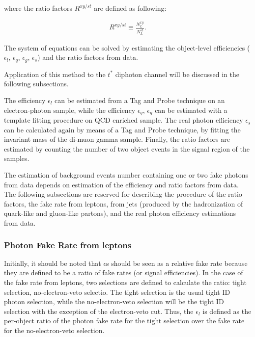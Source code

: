\documentclass[12pt,oneandhalf,chaparabic,phys,ms,eng]{metu}
\begin{document}
where the ratio factors $R^{xy/st}$ are defined as following:


\begin{eqnarray}
R^{xy/st} \equiv \frac{N_{L}^{xy}}{N_{L}^{st}}. \label{eq:R1}
\end{eqnarray}

The system of equations can be solved by estimating the object-level efficiencies ($\epsilon_l$, $\epsilon_q$, $\epsilon_g$, $\epsilon_s$) and the ratio factors from data.

Application of this method to the $t^{*}$ diphoton channel will be discussed in the following subsections.

The efficiency $\epsilon_l$ can be estimated from a Tag and Probe technique on an electron-photon sample, while the efficiency  $\epsilon_q$, $\epsilon_g$ can be estimated with a template fitting procedure on QCD enriched sample. The real photon efficiency $\epsilon_s$ can be calculated again by means of a Tag and Probe technique, by fitting the invariant mass of the di-muon gamma sample. Finally, the ratio factors are estimated by counting the number of two object events in the signal region of the samples. 

The estimation of background events number containing one or two fake photons from data depends on estimation of  the efficiency and ratio factors from data. The following subsections are reserved for describing the procedure of the ratio factors, the fake rate from leptons,  from jets (produced by the hadronization of quark-like and gluon-like partons), and the real photon efficiency estimations from data.

\subsubsection{Photon Fake Rate from leptons}
\label{fakerateleptons}
Initially, it should be noted that $\epsilon$s should be seen as a relative fake rate because they are defined to be a ratio of fake rates (or signal efficiencies).
In the case of the fake rate from leptons, two selections are defined to calculate the ratio: tight selection, no-electron-veto selectio. The tight selection is the usual tight ID photon selection, while the no-electron-veto selection will be the tight ID selection with the exception of the electron-veto cut. Thus, the $\epsilon_{l}$ is defined as the per-object ratio of the photon fake rate for the tight selection over the fake rate for the no-electron-veto selection.
\end{document}
